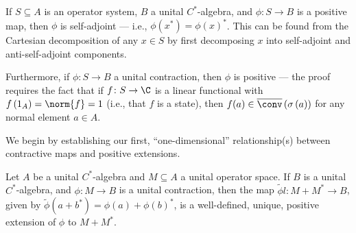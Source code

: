 \begin{remark}
  If $S\subseteq A$ is an operator system, $B$ a unital $C^{\ast}$-algebra, and $\phi\colon S\rightarrow B$ is a positive map, then $\phi$ is self-adjoint --- i.e., $\phi\left( x^{\ast} \right) = \phi\left( x \right)^{\ast}$. This can be found from the Cartesian decomposition of any $x\in S$ by first decomposing $x$ into self-adjoint and anti-self-adjoint components.\newline

  Furthermore, if $\phi\colon S\rightarrow B$ a unital contraction, then $\phi$ is positive --- the proof requires the fact that if $f\colon S\rightarrow \C$ is a linear functional with $f\left(1_A\right) = \norm{f} = 1$ (i.e., that $f$ is a state), then $f(a)\in \overline{\conv}\left( \sigma\left( a \right) \right)$ for any normal element $a\in A$.
\end{remark}
We begin by establishing our first, ``one-dimensional'' relationship(s) between contractive maps and positive extensions.
\begin{proposition}\label{prop:extension_of_contractions}
  Let $A$ be a unital $C^{\ast}$-algebra and $M\subseteq A$ a unital operator space. If $B$ is a unital $C^{\ast}$-algebra, and $\phi\colon M\rightarrow B$ is a unital contraction, then the map $\widetilde{\phi}l\colon M + M^{\ast}\rightarrow B$, given by $\widetilde{\phi}\left( a + b^{\ast} \right) = \phi\left( a \right) + \phi\left( b \right)^{\ast}$, is a well-defined, unique, positive extension of $\phi$ to $M + M^{\ast}$.
\end{proposition}
